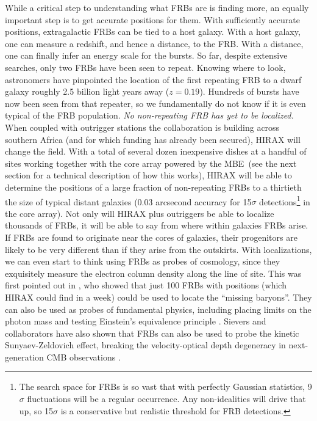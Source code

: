 \documentclass[letterpaper,11pt,preprint]{aastex}
\newcommand{\mbe}{{\rm MBE}}
\begin{document}
While a critical step to understanding what FRBs are is finding more,
an equally important step is to get accurate positions for them.  With
sufficiently accurate positions, extragalactic FRBs can be tied to a
host galaxy.  With a host galaxy, one can measure a redshift, and hence
a distance, to the FRB.  With a distance, one can finally infer an
energy scale for the bursts.  So far, despite extensive searches, only
two FRBs have been seen to repeat.  Knowing where to look, astronomers
have pinpointed the location of the first repeating FRB to a dwarf
galaxy roughly 2.5 billion light years away ($z=0.19$).  Hundreds of
bursts have now been seen from that repeater, so we fundamentally do
not know if it is even typical of the FRB population.  {\textit{No
    non-repeating FRB has yet to be localized.}}  When coupled with
outrigger stations the collaboration is building across southern
Africa (and for which funding has already been secured), HIRAX will
change the field.  With a total of several dozen inexpensive dishes at
a handful of sites working together with the core array powered by the
\mbe\ (see the next section for a technical description of how this
works), 
HIRAX will be able to determine the positions of a large
fraction of non-repeating FRBs to a thirtieth the size of typical
distant galaxies (0.03 arcsecond accuracy for 15$\sigma$
detections\footnote{The search space for FRBs is so vast that with
  perfectly Gaussian statistics, 9$\sigma$ fluctuations will be a
  regular occurrence.  Any non-idealities will drive that up, so
  15$\sigma$ is a conservative but realistic threshold for FRB
  detections.} in the core array).  
Not only will HIRAX plus
outriggers be able to localize thousands of FRBs, it will be able to
say from where within galaxies FRBs arise.  If FRBs are found to
originate near the cores of galaxies, their progenitors are likely to
be very different than if they arise from the outskirts.  With
localizations, we can even start to think using FRBs as probes of
cosmology, since they exquisitely measure the electron column density
along the line of site. This was first pointed out in
\citet{McQuinn2014}, who showed that just 100 FRBs with positions
(which HIRAX could find in a week) could be used to locate the
``missing baryons''.  They can also be used as probes of fundamental
physics, including placing limits on the photon mass
\citep{bonetti2017} and testing Einstein's equivalence principle
\citep{frb_equivalence}.  Sievers and collaborators have also shown
that FRBs can also be used to probe the kinetic Sunyaev-Zeldovich
effect, breaking the velocity-optical depth degeneracy in
next-generation CMB observations \citep{Madhavacheril18}.
\end{document}
